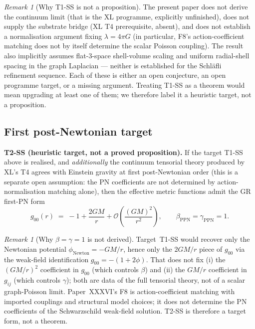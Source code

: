 \documentclass[12pt]{article}
\theoremstyle{definition}
\theoremstyle{remark}
\newtheorem{remark}[theorem]{Remark}
\begin{document}
\begin{remark}[Why T1-SS is not a proposition]
The present paper does not derive the continuum limit (that is the XL programme, explicitly unfinished), does not supply the substrate bridge (XL T4 prerequisite, absent), and does not establish a normalisation argument fixing $\lambda = 4\pi G$ (in particular, F8's action-coefficient matching does not by itself determine the scalar Poisson coupling). The result also implicitly assumes flat-3-space shell-volume scaling and uniform radial-shell spacing in the graph Laplacian --- neither is established for the Schl\"afli refinement sequence. Each of these is either an open conjecture, an open programme target, or a missing argument. Treating T1-SS as a theorem would mean upgrading at least one of them; we therefore label it a heuristic target, not a proposition.
\end{remark}

\subsection{First post-Newtonian target}

\textbf{T2-SS (heuristic target, not a proved proposition).} If the target T1-SS above is realised, and \emph{additionally} the continuum tensorial theory produced by XL's T4 agrees with Einstein gravity at first post-Newtonian order (this is a separate open assumption: the PN coefficients are not determined by action-normalisation matching alone), then the effective metric functions admit the GR first-PN form
\begin{equation}
g_{00}(r) \;=\; -1 + \frac{2GM}{r} + \mathcal{O}\!\left(\frac{(GM)^2}{r^2}\right), \qquad \beta_{\mathrm{PPN}} = \gamma_{\mathrm{PPN}} = 1.
\end{equation}

\begin{remark}[Why $\beta=\gamma=1$ is not derived]
Target~T1-SS would recover only the Newtonian potential $\phi_{\mathrm{Newton}} = -GM/r$, hence only the $2GM/r$ piece of $g_{00}$ via the weak-field identification $g_{00} = -(1 + 2\phi)$. That does not fix (i) the $(GM/r)^2$ coefficient in $g_{00}$ (which controls $\beta$) and (ii) the $GM/r$ coefficient in $g_{ij}$ (which controls $\gamma$); both are data of the full tensorial theory, not of a scalar graph-Poisson limit. Paper~XXXVI's F8 is action-coefficient matching with imported couplings and structural model choices; it does not determine the PN coefficients of the Schwarzschild weak-field solution. T2-SS is therefore a target form, not a theorem.
\end{remark}
\end{document}
